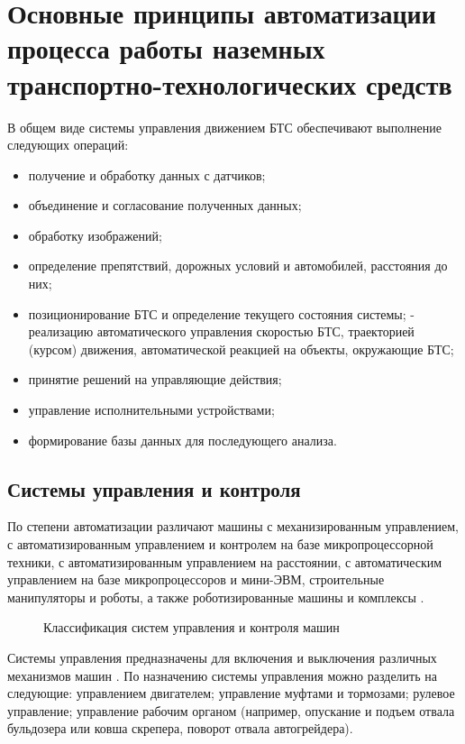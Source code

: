 \section{Основные принципы автоматизации процесса работы наземных транспортно-технологических средств}\label{sec:ch1/sec2}

В общем виде системы управления движением БТС обеспечивают выполнение следующих операций:

\begin{itemize}
    \item получение и обработку данных с датчиков;
    \item объединение и согласование полученных данных;
    \item обработку изображений;
    \item определение препятствий, дорожных условий и автомобилей, расстояния до них;
    \item позиционирование БТС и определение текущего состояния системы;
    - реализацию автоматического управления скоростью БТС, траекторией (курсом) движения, автоматической реакцией на объекты, окружающие БТС;
    \item принятие решений на управляющие действия;
    \item управление исполнительными устройствами;
    \item формирование базы данных для последующего анализа.
\end{itemize}

\subsection{Системы управления и контроля}\label{subsec:ch1/sec2/sub1}

По степени автоматизации различают машины с механизированным управлением, с автоматизированным управлением и контролем на базе микропроцессорной техники, с автоматизированным управлением на расстоянии, с автоматическим управлением на базе микропроцессоров и мини-ЭВМ, строительные манипуляторы и роботы, а также роботизированные машины и комплексы \cite[с.~39]{Evtukov}.

\begin{figure}[ht]
	\caption{Классификация систем управления и контроля машин}\label{fig:control_drawio}
\end{figure}

Системы управления предназначены для включения и выключения различных механизмов машин \cite[с.~109]{Evtukov}.
По назначению системы управления можно разделить на следующие: управлением двигателем; управление муфтами и тормозами; рулевое управление; управление рабочим органом (например, опускание и подъем отвала бульдозера или ковша скрепера, поворот отвала автогрейдера).

